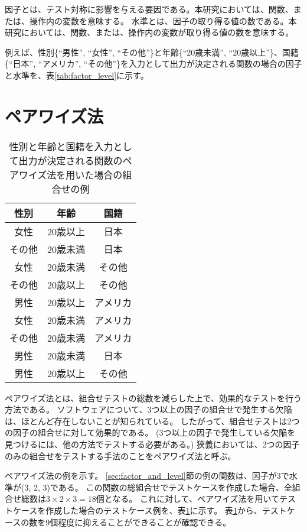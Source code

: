 \documentclass[uplatex, report, a4j, 10pt]{jsbook}
\begin{document}
因子とは、テスト対称に影響を与える要因である。本研究においては、関数、または、操作内の変数を意味する。
水準とは、因子の取り得る値の数である。本研究においては、関数、または、操作内の変数が取り得る値の数を意味する\cite{factor_level}。

例えば、性別\{``男性'', ``女性'', ``その他''\}と年齢\{``20歳未満'', ``20歳以上''\}、国籍\{``日本'', ``アメリカ'', ``その他''\}を入力として出力が決定される関数の場合の因子と水準を、表\ref{tab:factor_level}に示す。


\section{ペアワイズ法}
\begin{table}[tp]
  \begin{center}
    \caption{性別と年齢と国籍を入力として出力が決定される関数のペアワイズ法を用いた場合の組合せの例}
    \label{tab:example_pairwise}
    \begin{tabular}{c|c|c}
      性別   & 年齢     & 国籍     \\
      \hline
      \hline
      女性   & 20歳以上 & 日本     \\ \hline
      その他 & 20歳未満 & 日本     \\ \hline
      女性   & 20歳未満 & その他   \\ \hline
      その他 & 20歳以上 & その他   \\ \hline
      男性   & 20歳以上 & アメリカ \\ \hline
      女性   & 20歳未満 & アメリカ \\ \hline
      その他 & 20歳未満 & アメリカ \\ \hline
      男性   & 20歳未満 & 日本     \\ \hline
      男性   & 20歳以上 & その他   \\
    \end{tabular}
  \end{center}
\end{table}

ペアワイズ法とは、組合せテストの総数を減らした上で、効果的なテストを行う方法である\cite{pairwise}。
ソフトウェアについて、3つ以上の因子の組合せで発生する欠陥は、ほとんど存在しないことが知られている\cite{over3fact}。
したがって、組合せテストは2つの因子の組合せに対して効果的である。
(3つ以上の因子で発生している欠陥を見つけるには、他の方法でテストする必要がある。)
狭義においては、2つの因子のみの組合せをテストする手法のことをペアワイズ法と呼ぶ。

ペアワイズ法の例を示す。
\ref{sec:factor_and_level}節の例の関数は、因子が3で水準が(3, 2, 3)である。
この関数の総組合せでテストケースを作成した場合、全組合せ総数は$3 \times 2 \times 3 = 18個$となる。
これに対して、ペアワイズ法を用いてテストケースを作成した場合のテストケース例を、表\ref{tab:example_pairwise}に示す。
表\ref{tab:example_pairwise}から、テストケースの数を9個程度に抑えることができることが確認できる。
\end{document}
